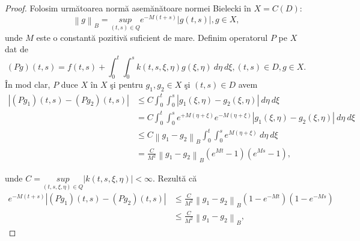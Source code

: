 \documentclass[a4paper,12pt,oneside]{report}
\begin{document}
\begin{proof}
Folosim urm\u{a}toarea norm\u{a} asem\u{a}n\u{a}toare normei Bielecki \^{i}n $ X = C \left ( D \right ):$
\begin{displaymath}
 \left \| g \right \| _{B} = \underset{\left ( t,s \right )\in Q}{sup}e^{-M\left ( t+s \right )}\left | g\left ( t,s \right ) \right |, g\in X,
\end{displaymath}
unde \(M\) este o constant\u{a} pozitiv\u{a} suficient de mare. Definim  operatorul \(P\) pe \(X\) dat de
\begin{displaymath}
  \left ( Pg \right )\left ( t,s \right ) = f\left ( t,s \right ) + \int_{0}^{t}\int_{0}^{s}k\left ( t,s,\xi ,\eta  \right )g\left ( \xi ,\eta  \right ) \ d\eta  \ d\xi , \left ( t,s \right ) \in D, g \in X.
\end{displaymath}
\^{I}n mod clar, \(P\) duce \(X\) \^{i}n  \(X\) \c{s}i pentru \(g_{1}, g_{2} \in X\) \c{s}i \(\left ( t,s \right )  \in D\) avem
 \begin{equation} \nonumber
     \begin{split}
          \left | \left ( Pg_{1} \right )\left ( t,s \right ) - \left ( Pg_{2} \right )\left ( t,s \right ) \right | &  \leq  C\int_{0}^{t}\int_{0}^{s} \left | g_{1}\left ( \xi ,\eta  \right ) - g_{2}\left ( \xi ,\eta  \right ) \right | \ d\eta  \ d\xi \\ &
          = C\int_{0}^{t}\int_{0}^{s} e^{+M\left ( \eta +\xi  \right )}e^{-M\left ( \eta +\xi  \right )}\left | g_{1}\left ( \xi ,\eta  \right ) - g_{2} \left ( \xi ,\eta  \right )\right | \ d\eta  \ d\xi \\ &
           \leq C\left \| g_{1} - g_{2} \right \|_{B} \int_{0}^{t}\int_{0}^{s} e^{M\left ( \eta +\xi  \right )} \ d\eta  \ d\xi  \\ &
          = \frac{C}{M^{2}}\left \| g_{1} - g_{2} \right \|_{B}\left ( e^{Mt}  - 1\right )\left ( e^{Ms} - 1 \right ),
     \end{split}
 \end{equation}

\noindent unde \(C = \underset{ \left ( t,s,\xi ,\eta  \right ) \in Q}{ sup}\left | k\left ( t,s,\xi ,\eta  \right ) \right | < \infty\). Rezult\u{a} c\u{a}
\begin{equation} \nonumber
    \begin{split}
        e^{-M\left ( t+s \right )} \left | \left ( Pg_{1} \right ) \left ( t,s \right ) - \left ( Pg_{2} \right )\left ( t,s \right )\right | &   \leq \frac{C}{M^{2}}\left \| g_{1} - g_{2} \right \|_{B}\left ( 1 - e ^{-Mt} \right )\left ( 1 - e^{-Ms} \right ) \\ &
        \leq \frac{C}{M^{2}}\left \| g_{1} - g_{2}\right \|_{B},
    \end{split}
\end{equation}


\end{proof}
\end{document}
